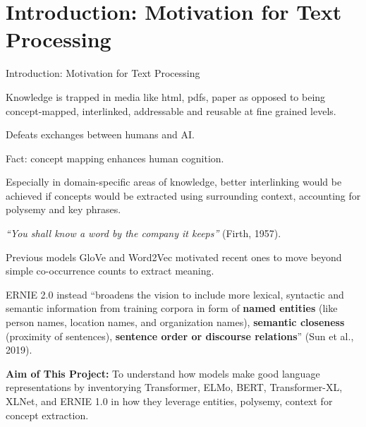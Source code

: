 
\section{Introduction: Motivation for Text Processing}


\begin{frame}{Introduction: Motivation for Text Processing}



\begin{itemizeSpaced}{5pt}

    \item Knowledge is trapped in media like html, pdfs, paper as opposed to being concept-mapped, interlinked, addressable and reusable at fine grained levels.
    
    \item Defeats exchanges between humans and AI.
    
    \item Fact: concept mapping enhances human cognition. 
    
    \item Especially in domain-specific areas of knowledge, better interlinking would be achieved if concepts would be extracted using surrounding context, accounting for polysemy and key phrases.
    
    \item {\color{Maroon} \emph{“You shall know a word by the company it keeps”} (Firth, 1957).}
    
    
    \item Previous models GloVe and Word2Vec motivated recent ones to move beyond simple co-occurrence counts to extract meaning. 
    
    \item ERNIE 2.0 instead “broadens the vision to include more lexical, syntactic and semantic information from training corpora in form of \textbf{named entities} (like person names, location names, and organization names), \textbf{semantic closeness} (proximity of sentences), \textbf{sentence order or discourse relations}” (Sun et al., 2019). 
    
    
    \item \textbf{Aim of This Project: } To understand how models make good language representations by inventorying Transformer, ELMo, BERT, Transformer-XL, XLNet, and ERNIE 1.0 in how they leverage entities, polysemy, context for concept extraction. 
    
    
\end{itemizeSpaced}
\end{frame}






